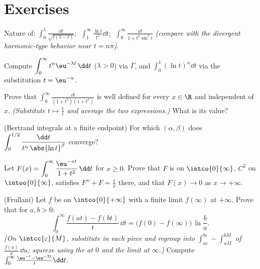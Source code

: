 \section{Exercises}

\begin{exercise}[$\star$]\label{exo:b2:integration:1}
Nature of:
$\displaystyle\int_0^1 \frac{\dd t}{\sqrt{t(1-t)}}$;
$\;\displaystyle\int_1^\infty \frac{\ln t}{t^2}\dd t$;
$\;\displaystyle\int_0^\infty \frac{\dd t}{1 + t^2\sin^2 t}$
\emph{(compare with the divergent harmonic-type behavior near $t =
n\pi$)}.
\end{exercise}

\begin{exercise}[$\star$]\label{exo:b2:integration:2}
Compute $\displaystyle\int_0^\infty t^n \eu^{-\lambda t}\,\dd t$
($\lambda > 0$) via $\Gamma$, and
$\displaystyle\int_0^1 (\ln t)^n \dd t$ via the substitution $t =
\eu^{-u}$.
\end{exercise}

\begin{exercise}[$\star$]\label{exo:b2:integration:3}
Prove that $\displaystyle\int_0^{\infty} \frac{\dd t}{(1 +
t^2)(1 + t^x)}$ is well defined for every $x \in \R$ and
independent of $x$. \emph{(Substitute $t \mapsto \frac1t$ and
average the two expressions.)} What is its value?
\end{exercise}

\begin{exercise}[$\star\star$]\label{exo:b2:integration:4}
(Bertrand integrals at a finite endpoint) For which $(\alpha,
\beta)$ does $\displaystyle\int_0^{1/2}
\frac{\dd t}{t^\alpha\,\abs{\ln t}^\beta}$ converge?
\end{exercise}

\begin{exercise}[$\star\star$]\label{exo:b2:integration:5}
Let $F(x) = \displaystyle\int_0^{\infty} \frac{\eu^{-xt}}{1 +
t^2}\,\dd t$ for $x \geq 0$. Prove that $F$ is  on
$\intco{0}{\infty}$, $C^2$ on $\intoo{0}{\infty}$, satisfies $F'' +
F = \frac1x$ there, and that $F(x) \to 0$ as $x \to +\infty$.
\end{exercise}

\begin{exercise}[$\star\star$]\label{exo:b2:integration:6}
(Frullani) Let $f$ be  on $\intco{0}{+\infty}$ with a
finite limit $f(\infty)$ at $+\infty$. Prove that for $a, b > 0$:
\[
\int_0^{\infty} \frac{f(at) - f(bt)}{t}\,\dd t
= \bigl(f(0) - f(\infty)\bigr)\,\ln\frac ba .
\]
\emph{(On $\intcc{\varepsilon}{M}$, substitute in each piece and
regroup into $\int_{a\varepsilon}^{b\varepsilon} -
\int_{aM}^{bM}$ of $\frac{f(u)}u\,\dd u$; squeeze using the
 at $0$ and the limit at $\infty$.)} Compute
$\int_0^\infty \frac{\eu^{-t} - \eu^{-2t}}{t}\dd t$.
\end{exercise}

